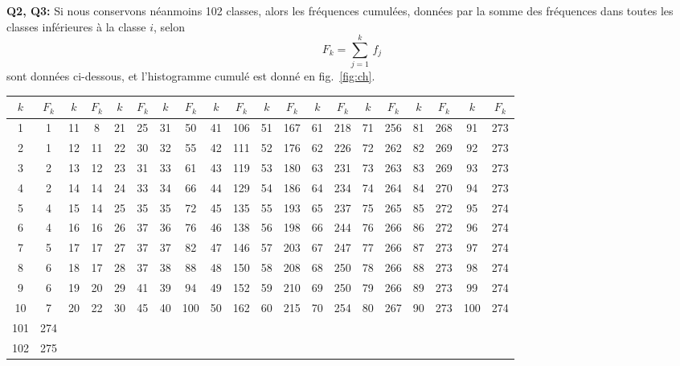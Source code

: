 \textbf{Q2, Q3:} Si nous conservons néanmoins 102 classes, alors les fréquences cumulées, données par la somme des fréquences dans toutes les classes inférieures à la classe $i$, selon
$$
F_k=\sum\limits_{j=1}^{k}\,f_j
$$
sont données ci-dessous, et l'histogramme cumulé est donné en fig.~\ref{fig:ch}.
\begin{center}
\scriptsize
\begin{tabular}{cccccccccccccccccccc}
$k$ & $F_k$ & $k$ & $F_k$ & $k$ & $F_k$ & $k$ & $F_k$ & $k$ & $F_k$ & $k$ & $F_k$ & $k$ & $F_k$ & $k$ & $F_k$ & $k$ & $F_k$ & $k$ & $F_k$ \\\hline
 1 & 1 & 11 &  8 & 21 & 25 & 31 &  50 & 41 & 106 & 51 & 167 & 61 & 218 & 71 & 256 & 81 & 268 &  91 & 273\\
 2 & 1 & 12 & 11 & 22 & 30 & 32 &  55 & 42 & 111 & 52 & 176 & 62 & 226 & 72 & 262 & 82 & 269 &  92 & 273\\
 3 & 2 & 13 & 12 & 23 & 31 & 33 &  61 & 43 & 119 & 53 & 180 & 63 & 231 & 73 & 263 & 83 & 269 &  93 & 273\\
 4 & 2 & 14 & 14 & 24 & 33 & 34 &  66 & 44 & 129 & 54 & 186 & 64 & 234 & 74 & 264 & 84 & 270 &  94 & 273\\
 5 & 4 & 15 & 14 & 25 & 35 & 35 &  72 & 45 & 135 & 55 & 193 & 65 & 237 & 75 & 265 & 85 & 272 &  95 & 274\\
 6 & 4 & 16 & 16 & 26 & 37 & 36 &  76 & 46 & 138 & 56 & 198 & 66 & 244 & 76 & 266 & 86 & 272 &  96 & 274\\
 7 & 5 & 17 & 17 & 27 & 37 & 37 &  82 & 47 & 146 & 57 & 203 & 67 & 247 & 77 & 266 & 87 & 273 &  97 & 274\\
 8 & 6 & 18 & 17 & 28 & 37 & 38 &  88 & 48 & 150 & 58 & 208 & 68 & 250 & 78 & 266 & 88 & 273 &  98 & 274\\
 9 & 6 & 19 & 20 & 29 & 41 & 39 &  94 & 49 & 152 & 59 & 210 & 69 & 250 & 79 & 266 & 89 & 273 &  99 & 274\\
10 & 7 & 20 & 22 & 30 & 45 & 40 & 100 & 50 & 162 & 60 & 215 & 70 & 254 & 80 & 267 & 90 & 273 & 100 & 274\\
101 & 274 \\
102 & 275 \\\hline
\end{tabular}
\normalsize
\end{center}

